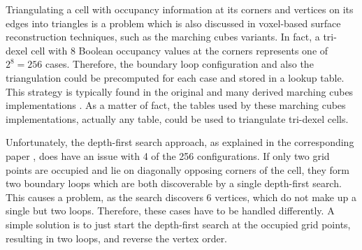 Triangulating a cell with occupancy information at its corners and vertices on its edges into triangles is a problem which is also discussed in voxel-based surface reconstruction techniques, such as the marching cubes variants.
In fact, a tri-dexel cell with 8 Boolean occupancy values at the corners represents one of $2^8 = 256$ cases.
Therefore, the boundary loop configuration and also the triangulation could be precomputed for each case and stored in a lookup table.
This strategy is typically found in the original and many derived marching cubes implementations \cite{marching_cubes}.
As a matter of fact, the tables used by these marching cubes implementations, actually any table, could be used to triangulate tri-dexel cells.

Unfortunately, the depth-first search approach, as explained in the corresponding paper \cite{tridexel_reconstruction}, does have an issue with 4 of the 256 configurations.
If only two grid points are occupied and lie on diagonally opposing corners of the cell, they form two boundary loops which are both discoverable by a single depth-first search.
This causes a problem, as the search discovers 6 vertices, which do not make up a single but two loops.
Therefore, these cases have to be handled differently.
A simple solution is to just start the depth-first search at the occupied grid points, resulting in two loops, and reverse the vertex order.

